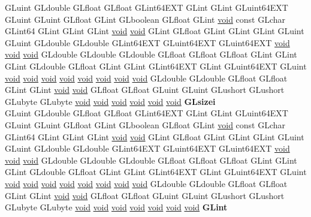 \begin{DoxyCompactItemize}
\begin{tabbing}
\>GLuint GLdouble GLfloat GLfloat GLint64EXT GLint GLint GLuint64EXT GLuint GLuint GLfloat GLint GLboolean GLfloat GLint \hyperlink{interfacevoid}{void} const GLchar GLint64 GLint GLint GLint \hyperlink{interfacevoid}{void} \hyperlink{interfacevoid}{void} GLint GLfloat GLint GLint GLint GLuint GLuint GLdouble GLdouble GLint64EXT GLuint64EXT GLuint64EXT \hyperlink{interfacevoid}{void} \hyperlink{interfacevoid}{void} \hyperlink{interfacevoid}{void} GLdouble GLdouble GLdouble GLfloat GLfloat GLfloat GLint GLint GLint GLdouble GLfloat GLint GLint GLint64EXT GLint GLuint64EXT GLuint \hyperlink{interfacevoid}{void} \hyperlink{interfacevoid}{void} \hyperlink{interfacevoid}{void} \hyperlink{interfacevoid}{void} \hyperlink{interfacevoid}{void} \hyperlink{interfacevoid}{void} \hyperlink{interfacevoid}{void} \hyperlink{interfacevoid}{void} GLdouble GLdouble GLfloat GLfloat GLint GLint \hyperlink{interfacevoid}{void} \hyperlink{interfacevoid}{void} GLfloat GLfloat GLuint GLuint GLushort GLushort GLubyte GLubyte \hyperlink{interfacevoid}{void} \hyperlink{interfacevoid}{void} \hyperlink{interfacevoid}{void} \hyperlink{interfacevoid}{void} \hyperlink{interfacevoid}{void} \hyperlink{interfacevoid}{void} {\bfseries GLsizei}\\
\>GLuint GLdouble GLfloat GLfloat GLint64EXT GLint GLint GLuint64EXT GLuint GLuint GLfloat GLint GLboolean GLfloat GLint \hyperlink{interfacevoid}{void} const GLchar GLint64 GLint GLint GLint \hyperlink{interfacevoid}{void} \hyperlink{interfacevoid}{void} GLint GLfloat GLint GLint GLint GLuint GLuint GLdouble GLdouble GLint64EXT GLuint64EXT GLuint64EXT \hyperlink{interfacevoid}{void} \hyperlink{interfacevoid}{void} \hyperlink{interfacevoid}{void} GLdouble GLdouble GLdouble GLfloat GLfloat GLfloat GLint GLint GLint GLdouble GLfloat GLint GLint GLint64EXT GLint GLuint64EXT GLuint \hyperlink{interfacevoid}{void} \hyperlink{interfacevoid}{void} \hyperlink{interfacevoid}{void} \hyperlink{interfacevoid}{void} \hyperlink{interfacevoid}{void} \hyperlink{interfacevoid}{void} \hyperlink{interfacevoid}{void} \hyperlink{interfacevoid}{void} GLdouble GLdouble GLfloat GLfloat GLint GLint \hyperlink{interfacevoid}{void} \hyperlink{interfacevoid}{void} GLfloat GLfloat GLuint GLuint GLushort GLushort GLubyte GLubyte \hyperlink{interfacevoid}{void} \hyperlink{interfacevoid}{void} \hyperlink{interfacevoid}{void} \hyperlink{interfacevoid}{void} \hyperlink{interfacevoid}{void} \hyperlink{interfacevoid}{void} \hyperlink{interfacevoid}{void} {\bfseries GLint}\\

\end{tabbing}
\end{DoxyCompactItemize}
